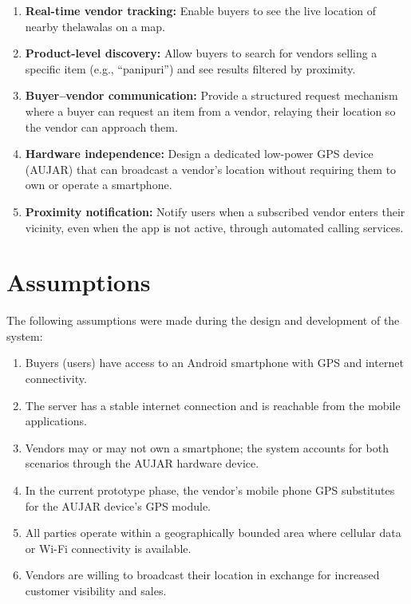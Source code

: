 \documentclass[12pt, a4paper]{article}
\begin{document}
\begin{enumerate}[noitemsep]
    \item \textbf{Real-time vendor tracking:} Enable buyers to see the live location of nearby thelawalas on a map.
    \item \textbf{Product-level discovery:} Allow buyers to search for vendors selling a specific item (e.g., ``panipuri'') and see results filtered by proximity.
    \item \textbf{Buyer--vendor communication:} Provide a structured request mechanism where a buyer can request an item from a vendor, relaying their location so the vendor can approach them.
    \item \textbf{Hardware independence:} Design a dedicated low-power GPS device (AUJAR) that can broadcast a vendor's location without requiring them to own or operate a smartphone.
    \item \textbf{Proximity notification:} Notify users when a subscribed vendor enters their vicinity, even when the app is not active, through automated calling services.
\end{enumerate}

\section{Assumptions}

The following assumptions were made during the design and development of the system:

\begin{enumerate}[noitemsep]
    \item Buyers (users) have access to an Android smartphone with GPS and internet connectivity.
    \item The server has a stable internet connection and is reachable from the mobile applications.
    \item Vendors may or may not own a smartphone; the system accounts for both scenarios through the AUJAR hardware device.
    \item In the current prototype phase, the vendor's mobile phone GPS substitutes for the AUJAR device's GPS module.
    \item All parties operate within a geographically bounded area where cellular data or Wi-Fi connectivity is available.
    \item Vendors are willing to broadcast their location in exchange for increased customer visibility and sales.
\end{enumerate}
\end{document}
